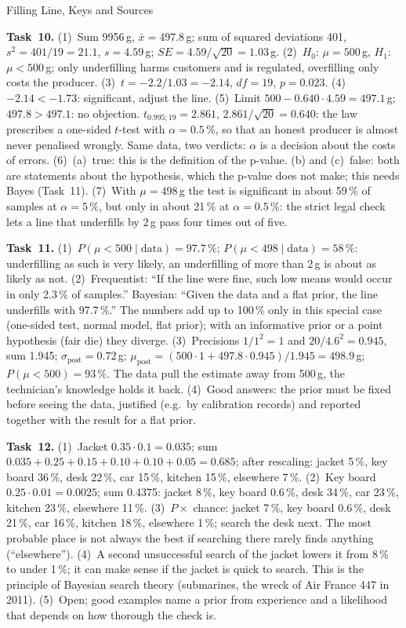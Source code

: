 \begin{uebungsblattc}{Filling Line, Keys and Sources}
\begin{lehrhinweis}
\textbf{Task~10.} (1)~Sum 9956\,g, $\bar{x}=497.8$\,g; sum of squared
deviations 401, $s^2=401/19=21.1$, $s=4.59$\,g;
$\mathit{SE}=4.59/\sqrt{20}=1.03$\,g. (2)~$H_0$: $\mu=500$\,g,
$H_1$: $\mu<500$\,g; only underfilling harms customers and is regulated,
overfilling only costs the producer. (3)~$t=-2.2/1.03=-2.14$,
$\mathit{df}=19$, $p=0.023$. (4)~$-2.14<-1.73$: significant, adjust the
line. (5)~Limit $500-0.640\cdot4.59=497.1$\,g; $497.8>497.1$: no
objection. $t_{0.995;19}=2.861$, $2.861/\sqrt{20}=0.640$: the law
prescribes a one-sided $t$-test with $\alpha=0.5\,\%$, so that an honest
producer is almost never penalised wrongly. Same data, two verdicts:
$\alpha$ is a decision about the costs of errors. (6)~(a)~true: this is
the definition of the p-value. (b) and (c)~false: both are statements
about the hypothesis, which the p-value does not make; this needs Bayes
(Task~11). (7)~With $\mu=498$\,g the test is significant in about 59\,\%
of samples at $\alpha=5\,\%$, but only in about 21\,\% at
$\alpha=0.5\,\%$: the strict legal check lets a line that underfills by
2\,g pass four times out of five.

\textbf{Task~11.} (1)~$P(\mu<500\mid\text{data})=97.7\,\%$;
$P(\mu<498\mid\text{data})=58\,\%$: underfilling as such is very
likely, an underfilling of more than 2\,g is about as likely as not.
(2)~Frequentist: \enquote{If the line were fine, such low means would
occur in only 2.3\,\% of samples.} Bayesian: \enquote{Given the data
and a flat prior, the line underfills with 97.7\,\%.} The numbers add up
to 100\,\% only in this special case (one-sided test, normal model, flat
prior); with an informative prior or a point hypothesis (fair die) they
diverge. (3)~Precisions $1/1^2=1$ and $20/4.6^2=0.945$, sum 1.945;
$\sigma_{\text{post}}=0.72$\,g;
$\mu_{\text{post}}=(500\cdot1+497.8\cdot0.945)/1.945=498.9$\,g;
$P(\mu<500)=93\,\%$. The data pull the estimate away from 500\,g, the
technician's knowledge holds it back. (4)~Good answers: the prior must be
fixed before seeing the data, justified (e.g.\ by calibration records)
and reported together with the result for a flat prior.

\textbf{Task~12.} (1)~Jacket $0.35\cdot0.1=0.035$; sum
$0.035+0.25+0.15+0.10+0.10+0.05=0.685$; after rescaling: jacket 5\,\%,
key board 36\,\%, desk 22\,\%, car 15\,\%, kitchen 15\,\%, elsewhere
7\,\%. (2)~Key board $0.25\cdot0.01=0.0025$; sum 0.4375: jacket 8\,\%,
key board 0.6\,\%, desk 34\,\%, car 23\,\%, kitchen 23\,\%, elsewhere
11\,\%. (3)~$P\times$ chance: jacket 7\,\%, key board 0.6\,\%, desk
21\,\%, car 16\,\%, kitchen 18\,\%, elsewhere 1\,\%; search the desk
next. The most probable place is not always the best if searching there
rarely finds anything (\enquote{elsewhere}). (4)~A second unsuccessful
search of the jacket lowers it from 8\,\% to under 1\,\%; it can make
sense if the jacket is quick to search. This is the principle of Bayesian
search theory (submarines, the wreck of Air France 447 in 2011).
(5)~Open; good examples name a prior from experience and a likelihood
that depends on how thorough the check is.


\end{lehrhinweis}
\end{uebungsblattc}
